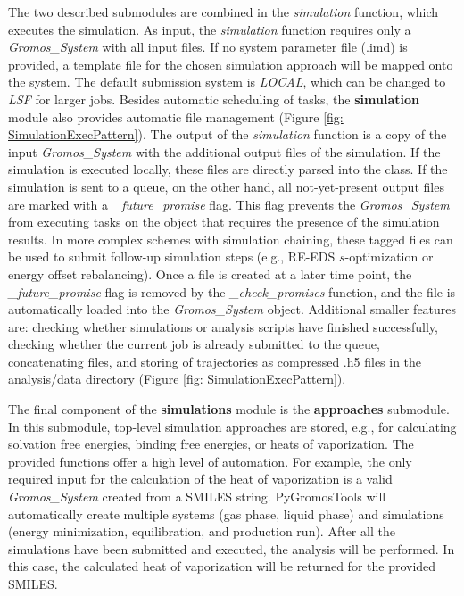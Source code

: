 The two described submodules are combined in the \textit{simulation} function, which executes the simulation. As input, the \textit{simulation} function requires only a \textit{Gromos\_System} with all input files. If no system parameter file (.imd) is provided, a template file for the chosen simulation approach will be mapped onto the system. The default submission system is \textit{LOCAL}, which can be changed to \textit{LSF} for larger jobs. Besides automatic scheduling of tasks, the \textbf{simulation} module also provides automatic file management (Figure \ref{fig: SimulationExecPattern}). The output of the \textit{simulation} function is a copy of the input \textit{Gromos\_System} with the additional output files of the simulation. If the simulation is executed locally, these files are directly parsed into the class. If the simulation is sent to a queue, on the other hand, all not-yet-present output files are marked with a \textit{\_future\_promise} flag. This flag prevents the \textit{Gromos\_System} from executing tasks on the object that requires the presence of the simulation results. In more complex schemes with simulation chaining, these tagged files can be used to submit follow-up simulation steps (e.g., RE-EDS $s$-optimization or energy offset rebalancing\cite{Ries2022}). Once a file is created at a later time point, the \textit{\_future\_promise} flag is removed by the \textit{\_check\_promises} function, and the file is automatically loaded into the \textit{Gromos\_System} object.
Additional smaller features are: checking whether simulations or analysis scripts have finished successfully, checking whether the current job is already submitted to the queue, concatenating files, and storing of trajectories as compressed .h5 files in the analysis/data directory (Figure \ref{fig: SimulationExecPattern}).

The final component of the \textbf{simulations} module is the \textbf{approaches} submodule. In this submodule, top-level simulation approaches are stored, e.g., for calculating solvation free energies, binding free energies, or heats of vaporization. The provided functions offer a high level of automation. For example, the only required input for the calculation of the heat of vaporization is a valid \textit{Gromos\_System} created from a SMILES string. PyGromosTools will automatically create multiple systems (gas phase, liquid phase) and simulations (energy minimization, equilibration, and production run). After all the simulations have been submitted and executed, the analysis will be performed. In this case, the calculated heat of vaporization will be returned for the provided SMILES.


